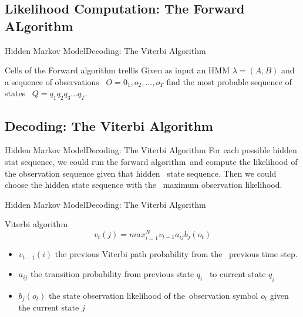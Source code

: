 \documentclass[10pt]{beamer}
\begin{document}
\subsection{Likelihood Computation: The Forward ALgorithm}
\begin{frame}{Hidden Markov Model}{Decoding: The Viterbi Algorithm}
    \begin{block}{Cells of the Forward algorithm trellis}
        Given as input an HMM $\lambda=(A,B)$ and a sequence of observations \
        $O={0_1,o_2,...,o_T}$ find the most probable sequence of states \
        $Q={q_1q_2q_3...q_T}$.
    \end{block}
\end{frame}

\subsection{Decoding: The Viterbi Algorithm}
\begin{frame}{Hidden Markov Model}{Decoding: The Viterbi Algorithm}
    For each possible hidden stat sequence, we could run the forward algorithm\
    and compute the likelihood of the observation sequence given that hidden \
    state sequence. Then we could choose the hidden state sequence with the \
    maximum observation likelihood.
\end{frame}

\begin{frame}{Hidden Markov Model}{Decoding: The Viterbi Algorithm}
    \begin{block}{Viterbi algorithm}
         \begin{equation}
            v_t(j) = max_{i=1}^{N}v_{t-1}a_{ij}b_j(o_t)
         \end{equation}
         \begin{itemize}
           \item $v_{t-1}(i)$ the previous Viterbi path probability from the \
                          previous time step.
           \item $a_{ij}$ the transition probability from previous state $q_i$ \
                          to current state $q_j$
           \item $b_j(o_t)$ the state observation likelihood of the\
                            observation symbol $o_t$ given the current state $j$
         \end{itemize}
    \end{block}
\end{frame}
\end{document}
